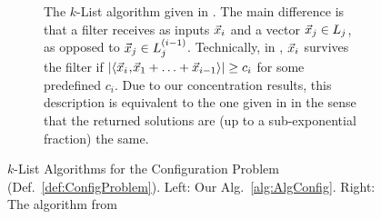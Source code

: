 \begin{figure}
\begin{subfigure}[t]{0.47\textwidth}
\caption{\footnotesize The $k$-List algorithm given in \cite{BLS16}. The main difference is that a filter receives as inputs $\vec x_i$ and a vector $\vec x_j \in L_j$, as opposed to $\vec x_j \in L_j^{(i-1)}$. Technically, in \cite{BLS16}, $\vec x_i$ survives the filter if $|\langle\vec x_i\!\mathbin{,}\!\vec x_1+\ldots+\vec x_{i-1}\rangle| \geq c_i$ for some predefined $c_i$. Due to our concentration results, this description is equivalent to the one given in \cite{BLS16} in the sense that the returned solutions are (up to a sub-exponential fraction) the same.}
\label{fig:AlgBLS}
\end{subfigure}
\caption[$k$-List algorithms for the Configuration problem]{$k$-List Algorithms for the Configuration Problem (Def.~\ref{def:ConfigProblem}). Left: Our Alg.~\ref{alg:AlgConfig}. Right: The algorithm from \cite{BLS16}}
\end{figure}

\clearpage